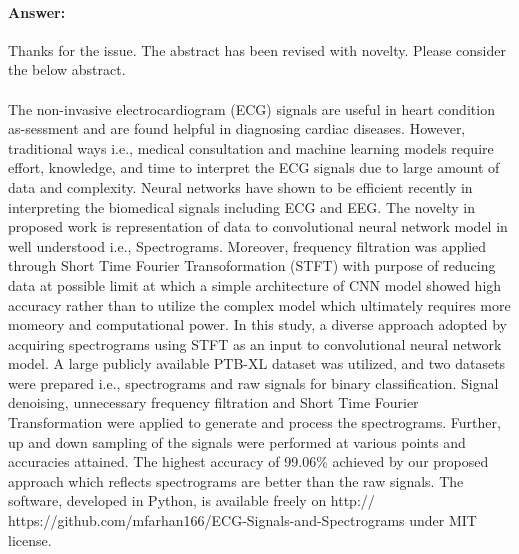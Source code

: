 \documentclass{article}
\begin{document}
\paragraph{Answer:}
Thanks for the issue. The abstract has been revised with novelty. Please consider the below abstract. \\ \\ The non-invasive electrocardiogram (ECG) signals are useful in heart condition as-sessment and are found helpful in diagnosing cardiac diseases. However, traditional ways i.e., medical consultation and machine learning models require effort, knowledge, and time to interpret the ECG signals due to large amount of data and complexity. Neural networks have shown to be efficient recently in interpreting the biomedical signals including ECG and EEG. The novelty in proposed work is representation of data to convolutional neural network model in well understood i.e., Spectrograms. Moreover, frequency filtration was applied through Short Time Fourier Transoformation (STFT) with purpose of reducing data at possible limit at which a simple architecture of CNN model showed high accuracy rather than to utilize the complex model which ultimately requires more momeory and computational power. In this study, a diverse approach adopted by acquiring spectrograms using STFT as an input to convolutional neural network model. A large publicly available PTB-XL dataset was utilized, and two datasets were prepared i.e., spectrograms and raw signals for binary classification. Signal denoising, unnecessary frequency filtration and Short Time Fourier Transformation were applied to generate and process the spectrograms. Further, up and down sampling of the signals were performed at various points and accuracies attained. The highest accuracy of 99.06\% achieved by our proposed approach which reflects spectrograms are better than the raw signals. The software, developed in Python, is available freely on http:// https://github.com/mfarhan166/ECG-Signals-and-Spectrograms under MIT license. \\\\
\end{document}
